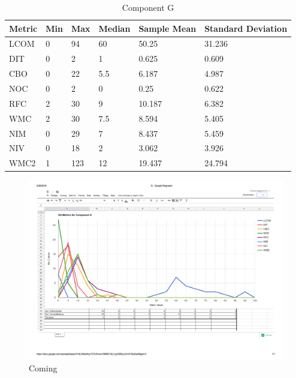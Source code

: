 \begin{table}[]
\centering
\caption{Component G}
\label{tab:oometrics-guri}
\begin{tabular}{|l|l|l|l|l|l|}
\hline
\textbf{Metric} & \textbf{Min} & \textbf{Max} & \textbf{Median} & \textbf{Sample Mean} & \textbf{Standard Deviation} \\ \hline
LCOM            & 0            & 94           & 60              & 50.25                & 31.236                      \\ \hline
DIT             & 0            & 2            & 1               & 0.625                & 0.609                       \\ \hline
CBO             & 0            & 22           & 5.5             & 6.187                & 4.987                       \\ \hline
NOC             & 0            & 2            & 0               & 0.25                 & 0.622                       \\ \hline
RFC             & 2            & 30           & 9               & 10.187               & 6.382                       \\ \hline
WMC             & 2            & 30           & 7.5             & 8.594                & 5.405                       \\ \hline
NIM             & 0            & 29           & 7               & 8.437                & 5.459                       \\ \hline
NIV             & 0            & 18           & 2               & 3.062                & 3.926                       \\ \hline
WMC2            & 1            & 123          & 12              & 19.437                 & 24.794                      \\ \hline
\end{tabular}
\end{table}

\begin{landscape}
\setlength\LTleft{-.5in}
	\begin{figure}
	\centering
	\includegraphics[width=\textwidth]{images/guri.pdf}
	\caption{Coming}
	\label{fig:gurigraph}
	\end{figure}
\end{landscape}






